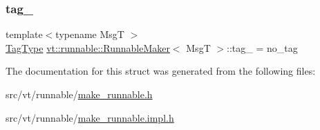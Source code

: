 \mbox{\label{structvt_1_1runnable_1_1_runnable_maker_a5d76922354a61ff8d94eb734960fb64b}} 
\subsubsection{\texorpdfstring{tag\+\_\+}{tag\_}}
{\footnotesize\ttfamily template$<$typename MsgT $>$ \\
\hyperlink{namespacevt_a84ab281dae04a52a4b243d6bf62d0e52}{Tag\+Type} \hyperlink{structvt_1_1runnable_1_1_runnable_maker}{vt\+::runnable\+::\+Runnable\+Maker}$<$ MsgT $>$\+::tag\+\_\+ = no\+\_\+tag\hspace{0.3cm}{\ttfamily [private]}}



The documentation for this struct was generated from the following files\+:\begin{DoxyCompactItemize}
\item 
src/vt/runnable/\hyperlink{make__runnable_8h}{make\+\_\+runnable.\+h}\item 
src/vt/runnable/\hyperlink{make__runnable_8impl_8h}{make\+\_\+runnable.\+impl.\+h}\end{DoxyCompactItemize}
